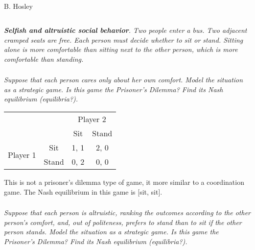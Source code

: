 \documentclass[12pt]{amsart}
\begin{document}
\raggedbottom

\hspace{\fill} {\large B. Hosley}
\bigskip


\subsection{}
\textit{\textbf{Selfish and altruistic social behavior}. Two people enter a bus. Two adjacent cramped seats
	are free. Each person must decide whether to sit or stand. Sitting alone is more comfortable
	than sitting next to the other person, which is more comfortable than standing.}
	
	\subsubsection{}
	\textit{Suppose that each person cares only about her own comfort. Model the situation as a
	strategic game. Is this game the Prisoner’s Dilemma? Find its Nash equilibrium
	(equilibria?).}
	
	\begin{center}
		\def\arraystretch{1.25}%
		\begin{tabular}{cccc}
			&                            & \multicolumn{2}{c}{Player 2}                           \\
			& \multicolumn{1}{c|}{}      & \multicolumn{1}{c|}{Sit}  & \multicolumn{1}{c|}{Stand} \\ \cline{2-4} 
			\multirow{2}{*}{Player 1} & \multicolumn{1}{c|}{Sit}   & \multicolumn{1}{c|}{1, 1} & \multicolumn{1}{c|}{2, 0}  \\ \cline{2-4} 
			& \multicolumn{1}{c|}{Stand} & \multicolumn{1}{c|}{0, 2} & \multicolumn{1}{c|}{0, 0}  \\ \cline{2-4} 
		\end{tabular}
	\end{center}
	
	This is not a prisoner's dilemma type of game, it more similar to a coordination game.
	The Nash equilibrium in this game is [sit, sit].
	
	\subsubsection{}
	\textit{Suppose that each person is altruistic, ranking the outcomes according to the other
	person’s comfort, and, out of politeness, prefers to stand than to sit if the other person
	stands. Model the situation as a strategic game. Is this game the Prisoner’s Dilemma?
	Find its Nash equilibrium (equilibria?).}
	
\end{document}
